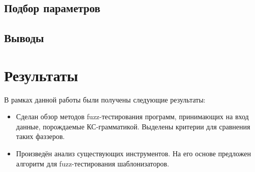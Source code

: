 \documentclass[a4paper]{article}
\begin{document}
\subsection{Подбор параметров}

\subsection{Выводы}

\newpage
\section{Результаты}
\indent

В рамках данной работы были получены следующие результаты:
\begin{itemize}
    \item Сделан обзор методов fuzz-тестирования программ, принимающих на вход данные, порождаемые КС-грамматикой. Выделены критерии для сравнения таких фаззеров.
    \item Произведён анализ существующих инструментов. На его основе предложен алгоритм для fuzz-тестирования шаблонизаторов.
\end{itemize}

\newpage
\end{document}
